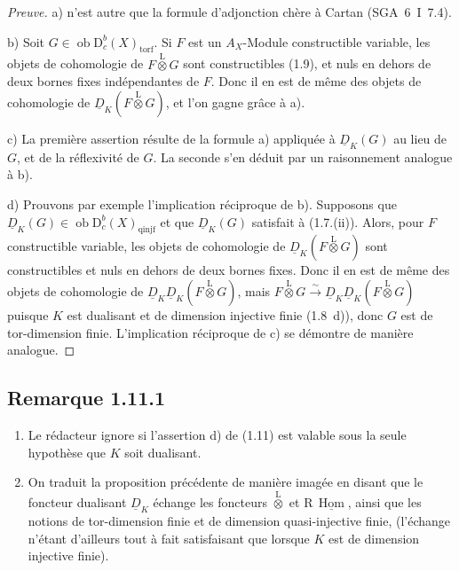 \documentclass[11pt]{article}
\DeclareMathOperator{\Hom}{Hom}
\newcommand{\R}{\mathrm{R}}
\newcommand{\D}{\mathrm{D}}
\newcommand{\ob}{\operatorname{ob}}
\providecommand{\Hom}{\operatorname{Hom}}
\providecommand{\ob}{\operatorname{ob}}
\providecommand{\R}{\mathrm R}
\begin{document}
\begin{proof}[Preuve]
a) n'est autre que la formule d'adjonction chère à Cartan (SGA~6~I~7.4).

b) Soit $G \in \ob \D_c^{b}(X)_{\mathrm{torf}}$. Si $F$ est un $A_X$-Module constructible variable, les objets de cohomologie de $F \mathop{\otimes}\limits^{\mathrm{L}} G$ sont constructibles (1.9), et nuls en dehors de deux bornes fixes indépendantes de $F$. Donc il en est de même des objets de cohomologie de $\underline{D}_K(F \mathop{\otimes}\limits^{\mathrm{L}} G)$, et l'on gagne grâce à a).

c) La première assertion résulte de la formule a) appliquée à $\underline{D}_K(G)$ au lieu de $G$, et de la réflexivité de $G$. La seconde s'en déduit par un raisonnement analogue à b).

d) Prouvons par exemple l'implication réciproque de b). Supposons que $\underline{D}_K(G) \in \ob \D_c^{b}(X)_{\mathrm{qinjf}}$ et que $\underline{D}_K(G)$ satisfait à (1.7.(ii)). Alors, pour $F$ constructible variable, les objets de cohomologie de $\underline{D}_K(F \mathop{\otimes}\limits^{\mathrm{L}} G)$ sont constructibles et nuls en dehors de deux bornes fixes. Donc il en est de même des objets de cohomologie de $\underline{D}_K \underline{D}_K(F \mathop{\otimes}\limits^{\mathrm{L}} G)$, mais $F \mathop{\otimes}\limits^{\mathrm{L}} G \xrightarrow{\sim} \underline{D}_K \underline{D}_K(F \mathop{\otimes}\limits^{\mathrm{L}} G)$ puisque $K$ est dualisant et de dimension injective finie (1.8~d)), donc $G$ est de tor-dimension finie. L'implication réciproque de c) se démontre de manière analogue.
\end{proof}

\subsection*{Remarque 1.11.1}
\begin{enumerate}
\item[a)] Le rédacteur ignore si l'assertion d) de (1.11) est valable sous la seule hypothèse que $K$ soit dualisant.
\item[b)] On traduit la proposition précédente de manière imagée en disant que le foncteur dualisant $\underline{D}_K$ échange les foncteurs $\mathop{\otimes}\limits^{\mathrm{L}}$ et $\R\,\underline{\Hom}$, ainsi que les notions de tor-dimension finie et de dimension quasi-injective finie, (l'échange n'étant d'ailleurs tout à fait satisfaisant que lorsque $K$ est de dimension injective finie).
\end{enumerate}
\end{document}
